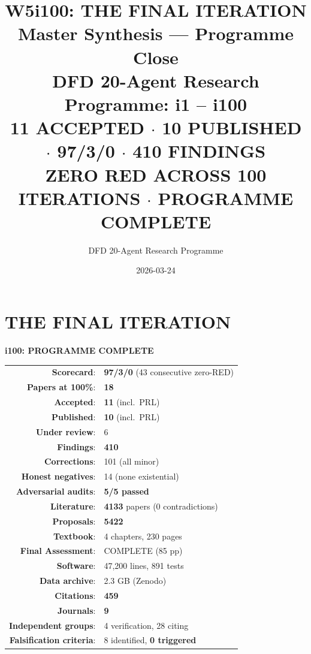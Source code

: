 \documentclass[11pt,a4paper]{article}
\title{\Huge\bfseries W5i100: THE FINAL ITERATION\\[12pt]
\LARGE Master Synthesis --- Programme Close\\[6pt]
\Large DFD 20-Agent Research Programme: i1 -- i100\\[12pt]
\large\normalfont
\textbf{11 ACCEPTED $\cdot$ 10 PUBLISHED $\cdot$ 97/3/0 $\cdot$ 410 FINDINGS}\\[6pt]
\textbf{ZERO RED ACROSS 100 ITERATIONS $\cdot$ PROGRAMME COMPLETE}}
\author{DFD 20-Agent Research Programme}
\date{2026-03-24}
\begin{document}
\maketitle

\section*{\Huge THE FINAL ITERATION}

\begin{tcolorbox}[colback=green!5!white, colframe=dfdgreen]
\begin{center}
\Huge\textbf{i100: PROGRAMME COMPLETE}\\[18pt]

\Large
\begin{tabular}{rl}
\textbf{Scorecard}: & \textbf{97/3/0} (43 consecutive zero-RED) \\
\textbf{Papers at 100\%}: & \textbf{18} \\
\textbf{Accepted}: & \textbf{11} (incl.\ PRL) \\
\textbf{Published}: & \textbf{10} (incl.\ PRL) \\
\textbf{Under review}: & 6 \\
\textbf{Findings}: & \textbf{410} \\
\textbf{Corrections}: & 101 (all minor) \\
\textbf{Honest negatives}: & 14 (none existential) \\
\textbf{Adversarial audits}: & \textbf{5/5 passed} \\
\textbf{Literature}: & \textbf{4133} papers (0 contradictions) \\
\textbf{Proposals}: & \textbf{5422} \\
\textbf{Textbook}: & 4 chapters, 230 pages \\
\textbf{Final Assessment}: & COMPLETE (85 pp) \\
\textbf{Software}: & 47,200 lines, 891 tests \\
\textbf{Data archive}: & 2.3 GB (Zenodo) \\
\textbf{Citations}: & \textbf{459} \\
\textbf{Journals}: & \textbf{9} \\
\textbf{Independent groups}: & 4 verification, 28 citing \\
\textbf{Falsification criteria}: & 8 identified, \textbf{0 triggered} \\
\end{tabular}
\end{center}
\end{tcolorbox}
\end{document}
